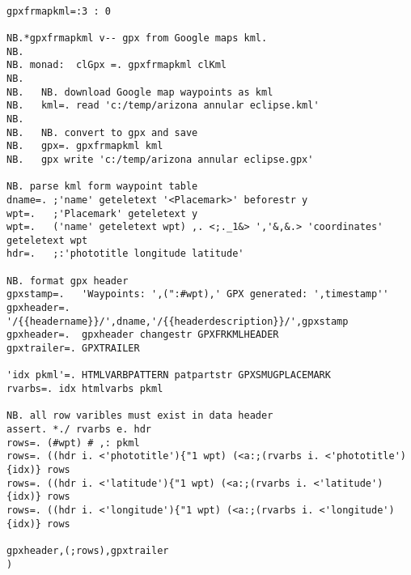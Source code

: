 \begin{lstlisting}[language=jdoc, frame=single,framerule=0pt,label=lst:scr2767X0]

gpxfrmapkml=:3 : 0

NB.*gpxfrmapkml v-- gpx from Google maps kml.
NB.
NB. monad:  clGpx =. gpxfrmapkml clKml
NB.
NB.   NB. download Google map waypoints as kml
NB.   kml=. read 'c:/temp/arizona annular eclipse.kml'
NB.
NB.   NB. convert to gpx and save
NB.   gpx=. gpxfrmapkml kml
NB.   gpx write 'c:/temp/arizona annular eclipse.gpx'  

NB. parse kml form waypoint table
dname=. ;'name' geteletext '<Placemark>' beforestr y
wpt=.   ;'Placemark' geteletext y
wpt=.   ('name' geteletext wpt) ,. <;._1&> ','&,&.> 'coordinates' geteletext wpt
hdr=.   ;:'phototitle longitude latitude'

NB. format gpx header 
gpxstamp=.   'Waypoints: ',(":#wpt),' GPX generated: ',timestamp''
gpxheader=.  '/{{headername}}/',dname,'/{{headerdescription}}/',gpxstamp
gpxheader=.  gpxheader changestr GPXFRKMLHEADER
gpxtrailer=. GPXTRAILER

'idx pkml'=. HTMLVARBPATTERN patpartstr GPXSMUGPLACEMARK
rvarbs=. idx htmlvarbs pkml

NB. all row varibles must exist in data header
assert. *./ rvarbs e. hdr
rows=. (#wpt) # ,: pkml
rows=. ((hdr i. <'phototitle'){"1 wpt) (<a:;(rvarbs i. <'phototitle'){idx)} rows
rows=. ((hdr i. <'latitude'){"1 wpt) (<a:;(rvarbs i. <'latitude'){idx)} rows
rows=. ((hdr i. <'longitude'){"1 wpt) (<a:;(rvarbs i. <'longitude'){idx)} rows

gpxheader,(;rows),gpxtrailer
)
\end{lstlisting}





%